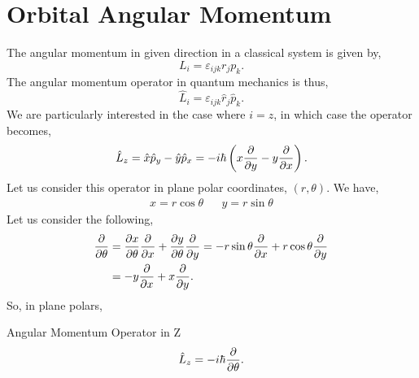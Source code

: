 \documentclass{book}
\begin{document}
\section{Orbital Angular Momentum}
The angular momentum in given direction in a classical system is given by,
\begin{equation}
	L_i = \varepsilon_{ijk}r_jp_k.
\end{equation}
The angular momentum operator in quantum mechanics is thus,
\begin{equation}
	\hat{L}_i = \varepsilon_{ijk}\hat{r}_j\hat{p}_k.
\end{equation}
We are particularly interested in the case where $i=z$, in which case the operator becomes,
\begin{equation}
	\hat{L}_z = \hat{x}\hat{p}_y - \hat{y}\hat{p}_x = -i\hbar\left(x\pdv{y} - y\pdv{x}\right).
\end{equation}
Let us consider this operator in plane polar coordinates, $(r, \theta)$. We have,
\begin{align}
	x = r\cos\theta && y = r\sin\theta
\end{align}
Let us consider the following,
\begin{equation}
	\begin{split}
	\pdv{\theta} & = \pdv{x}{\theta}\pdv{x} + \pdv{y}{\theta} \pdv{y} = -r\sin\theta \pdv{x} + r\cos\theta\pdv{y}\\
	& = -y\pdv{x} + x\pdv{y}.
\end{split}
\end{equation}
So, in plane polars,
\begin{Definitions}{Angular Momentum Operator in Z}{}
	\begin{equation}
	\hat{L}_z = -i\hbar \pdv{\theta}.
\end{equation}
\end{Definitions}
\end{document}
